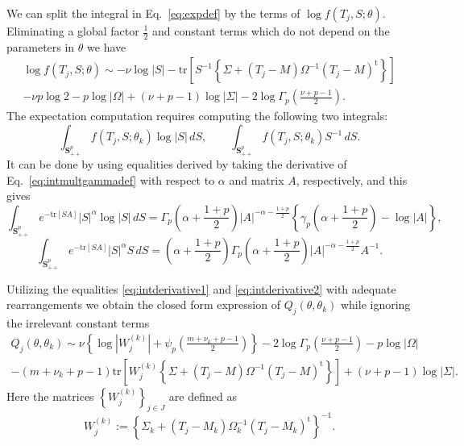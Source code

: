 \documentclass[english,listof=totoc]{scrartcl}
\begin{document}
We can split the integral in Eq.~\eqref{eq:expdef} by the terms of $\log f(T_{j},S;\theta)$. Eliminating a global factor $\frac{1}{2}$ and constant terms which do not depend on the parameters in $\theta$ we have
\begin{equation}
\begin{split}\log f(T_{j},S;\theta)\sim -\nu\log|S|-\textrm{tr}\left[S^{-1}\left\{\Sigma+(T_j-M)\Omega^{-1}(T_j-M)^{\textrm{t}}\right\}\right]\\
-\nu p\log2-p\log |\Omega|+(\nu+p-1)\log |\Sigma|-2\log\Gamma_{p}\left(\frac{\nu+p-1}{2}\right).
\end{split}\label{eq:logf}
\end{equation}
The expectation computation requires computing the following two integrals:
\begin{equation}
\int_{\mathbf{S}_{++}^p}f(T_j,S;\theta_k)\log |S|\,dS, \qquad 
\int_{\mathbf{S}_{++}^p}f(T_j,S;\theta_k) S^{-1}\,dS.
\end{equation}
It can be done by using equalities derived by taking the derivative of Eq.~\eqref{eq:intmultgammadef} with respect to $\alpha$ and matrix $A$, respectively, and this gives
\begin{equation}
\int_{\mathbf{S}_{++}^p}e^{-\textrm{tr}\left[SA\right]}|S|^{\alpha}\log |S|\,dS=\Gamma_{p}\left(\alpha+\frac{1+p}{2}\right)|A|^{-\alpha-\frac{1+p}{2}}\left\{\gamma_{p}\left(\alpha+\frac{1+p}{2}\right)-\log |A|\right\},\label{eq:intderivative1}
\end{equation}
\begin{equation}
\int_{\mathbf{S}_{++}^p}e^{-\textrm{tr}\left[SA\right]}|S|^{\alpha}S\,dS=\left(\alpha+\frac{1+p}{2}\right)\Gamma_{p}\left(\alpha+\frac{1+p}{2}\right)|A|^{-\alpha-\frac{1+p}{2}}A^{-1}.\label{eq:intderivative2}
\end{equation}

Utilizing the equalities \eqref{eq:intderivative1} and \eqref{eq:intderivative2} with adequate rearrangements we obtain the closed form expression of $Q_j(\theta,\theta_k)$ while ignoring the irrelevant constant terms
\begin{equation}
\begin{split}Q_j(\theta,\theta_k) \sim \nu\left\{\log|W_j^{(k)}|+\psi_{p}\left(\frac{m+\nu_k+p-1}{2}\right)\right\}-2\log\Gamma_{p}\left(\frac{\nu+p-1}{2}\right)-p\log|\Omega|\\
-(m+\nu_k+p-1)\textrm{tr}\left[W_j^{(k)}\left\{\Sigma+(T_j-M)\Omega^{-1}(T_j-M)^{\textrm{t}}\right\}\right]+(\nu+p-1)\log |\Sigma|.
\end{split}
\label{eq:fsimp}
\end{equation}
Here the matrices $\left\{W_j^{(k)}\right\}_{j\in J}$ are defined as
\begin{equation}
W_j^{(k)}:=\left\{\Sigma_k+(T_j-M_k)\Omega_k^{-1}(T_j-M_k)^{\textrm{t}}\right\}^{-1}.
\end{equation}
\end{document}
